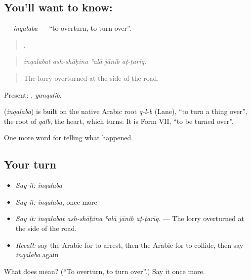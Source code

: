 \subsection*{You'll want to know: }
\textbf{} — \emph{inqalaba} — \textquotedblleft{}to overturn, to turn over\textquotedblright{}.

\begin{quote}
    .
\end{quote}

\begin{quote}
\emph{inqalabat ash-shāḥina ʿalā jānib aṭ-ṭarīq.}
\end{quote}

\begin{quote}
The lorry overturned at the side of the road.
\end{quote}

Present: , \emph{yanqalib}.

\begin{cousinweb}
\textbf{} (\emph{inqalaba}) is built on the native Arabic root \emph{q-l-b} (Lane), \textquotedblleft{}to turn a thing over\textquotedblright{}, the root of \emph{qalb}, the heart, which turns. It is Form VII, \textquotedblleft{}to be turned over\textquotedblright{}.
\end{cousinweb}

\begin{grammarlens}[title={What you've built}]
One more word for telling what happened.
\end{grammarlens}

\subsection*{Your turn}
\begin{itemize}
\raggedright
  \item \emph{Say it:} \emph{inqalaba}
  \item \emph{Say it:} \emph{inqalaba}, once more
  \item \emph{Say it:} \emph{inqalabat ash-shāḥina ʿalā jānib aṭ-ṭarīq.} — The lorry overturned at the side of the road.
  \item \emph{Recall:} say the Arabic for to arrest, then the Arabic for to collide, then say \emph{inqalaba} again
\end{itemize}

\begin{tcolorbox}[breakable,colback=teal!4,colframe=teal!35!black,title={Before you move on}]
What does  mean? (\textquotedblleft{}To overturn, to turn over\textquotedblright{}.) Say it once more.
\end{tcolorbox}
